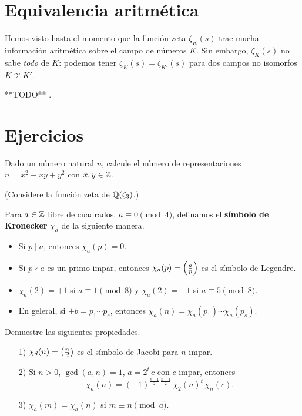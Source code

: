 
\section{Equivalencia aritmética}

Hemos visto hasta el momento que la función zeta $\zeta_K (s)$ trae mucha
información aritmética sobre el campo de números $K$. Sin embargo, $\zeta_K (s)$
no sabe \emph{todo} de $K$: podemos tener $\zeta_K (s) = \zeta_{K'} (s)$ para
dos campos no isomorfos $K \not\cong K'$.

**TODO** \cite{Perlis-1977}.
\fi


\pagebreak


\section*{Ejercicios}

\begin{ejercicio}
  Dado un número natural $n$, calcule el número de representaciones
  $n = x^2 - xy + y^2$ con $x,y \in \mathbb{Z}$.

  \noindent (Considere la función zeta de $\mathbb{Q} (\zeta_3)$.)
\end{ejercicio}

\begin{ejercicio}
  Para $a \in \mathbb{Z}$ libre de cuadrados, $a \equiv 0 \pmod{4}$, definamos el
  \textbf{símbolo de Kronecker} $\chi_a$ de la siguiente manera.
  \begin{itemize}
  \item Si $p \mid a$, entonces $\chi_a (p) = 0$.
  \item Si $p \nmid a$ es un primo impar, entonces $\chi_a (p) = \left(\frac{a}{p}\right)$
    es el símbolo de Legendre.
  \item $\chi_a (2) = +1$ si $a \equiv 1 \pmod{8}$ y $\chi_a (2) = -1$ si
    $a \equiv 5 \pmod{8}$.
  \item En geleral, si $\pm b = p_1 \cdots p_s$, entonces
    $\chi_a (n) = \chi_a (p_1) \cdots \chi_a (p_s)$.
  \end{itemize}

  Demuestre las siguientes propiedades.
  \begin{enumerate}
  \item[1)] $\chi_d (n) = \left(\frac{n}{d}\right)$ es el símbolo de Jacobi para $n$
    impar.
  \item[2)] Si $n > 0$, $\gcd (a,n) = 1$, $a = 2^t\,c$ con $c$ impar, entonces
    $$\chi_a (n) = (-1)^{\frac{c-1}{2}\,\frac{n-1}{2}}\,\chi_2 (n)^t \, \chi_n (c).$$
  \item[3)] $\chi_a (m) = \chi_a (n)$ si $m \equiv n \pmod{a}$.
  \end{enumerate}
\end{ejercicio}

